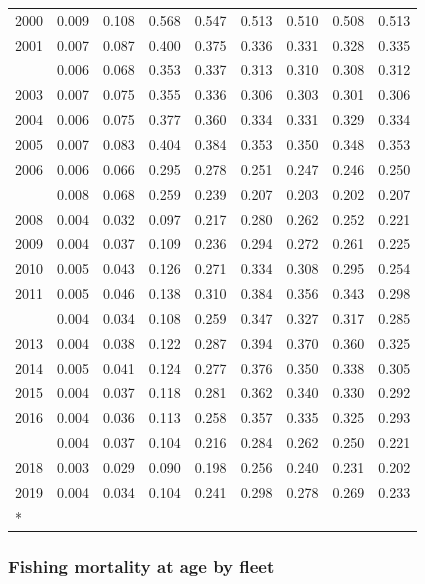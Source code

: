 \documentclass[
]{article}
\begin{document}
\begin{longtable}[t]{lrrrrrrrr}
2000 & 0.009 & 0.108 & 0.568 & 0.547 & 0.513 & 0.510 & 0.508 & 0.513\\
2001 & 0.007 & 0.087 & 0.400 & 0.375 & 0.336 & 0.331 & 0.328 & 0.335\\
\addlinespace
2002 & 0.006 & 0.068 & 0.353 & 0.337 & 0.313 & 0.310 & 0.308 & 0.312\\
2003 & 0.007 & 0.075 & 0.355 & 0.336 & 0.306 & 0.303 & 0.301 & 0.306\\
2004 & 0.006 & 0.075 & 0.377 & 0.360 & 0.334 & 0.331 & 0.329 & 0.334\\
2005 & 0.007 & 0.083 & 0.404 & 0.384 & 0.353 & 0.350 & 0.348 & 0.353\\
2006 & 0.006 & 0.066 & 0.295 & 0.278 & 0.251 & 0.247 & 0.246 & 0.250\\
\addlinespace
2007 & 0.008 & 0.068 & 0.259 & 0.239 & 0.207 & 0.203 & 0.202 & 0.207\\
2008 & 0.004 & 0.032 & 0.097 & 0.217 & 0.280 & 0.262 & 0.252 & 0.221\\
2009 & 0.004 & 0.037 & 0.109 & 0.236 & 0.294 & 0.272 & 0.261 & 0.225\\
2010 & 0.005 & 0.043 & 0.126 & 0.271 & 0.334 & 0.308 & 0.295 & 0.254\\
2011 & 0.005 & 0.046 & 0.138 & 0.310 & 0.384 & 0.356 & 0.343 & 0.298\\
\addlinespace
2012 & 0.004 & 0.034 & 0.108 & 0.259 & 0.347 & 0.327 & 0.317 & 0.285\\
2013 & 0.004 & 0.038 & 0.122 & 0.287 & 0.394 & 0.370 & 0.360 & 0.325\\
2014 & 0.005 & 0.041 & 0.124 & 0.277 & 0.376 & 0.350 & 0.338 & 0.305\\
2015 & 0.004 & 0.037 & 0.118 & 0.281 & 0.362 & 0.340 & 0.330 & 0.292\\
2016 & 0.004 & 0.036 & 0.113 & 0.258 & 0.357 & 0.335 & 0.325 & 0.293\\
\addlinespace
2017 & 0.004 & 0.037 & 0.104 & 0.216 & 0.284 & 0.262 & 0.250 & 0.221\\
2018 & 0.003 & 0.029 & 0.090 & 0.198 & 0.256 & 0.240 & 0.231 & 0.202\\
2019 & 0.004 & 0.034 & 0.104 & 0.241 & 0.298 & 0.278 & 0.269 & 0.233\\*
\end{longtable}

\subsubsection{Fishing mortality at age by
fleet}\label{fishing-mortality-at-age-by-fleet}
\end{document}
